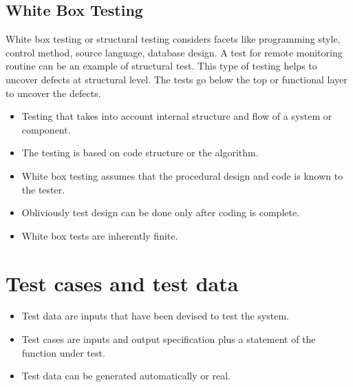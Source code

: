 \subsection{White Box Testing}
White box testing or structural testing considers facets like programming style, control method, source language, database design. A test for remote monitoring routine can be an example of structural test. This type of testing helps to uncover defects at structural level. The tests go below the top or functional layer to uncover the defects.
\begin{itemize}
\item Testing that takes into account internal structure and flow of a system or component.
\item The testing is based on code structure or the algorithm.
\item White box testing assumes that the procedural design and code is known to the tester.
\item Obliviously test design can be done only after coding is complete.
\item White box tests are inherently finite.
\end{itemize}

\section{Test cases and test data}
\begin{itemize}
\item Test data are inputs that have been devised to test the system.
\item Test cases are inputs and output specification plus a statement of the function under test.
\item Test data can be generated automatically or real. 
\end{itemize}

